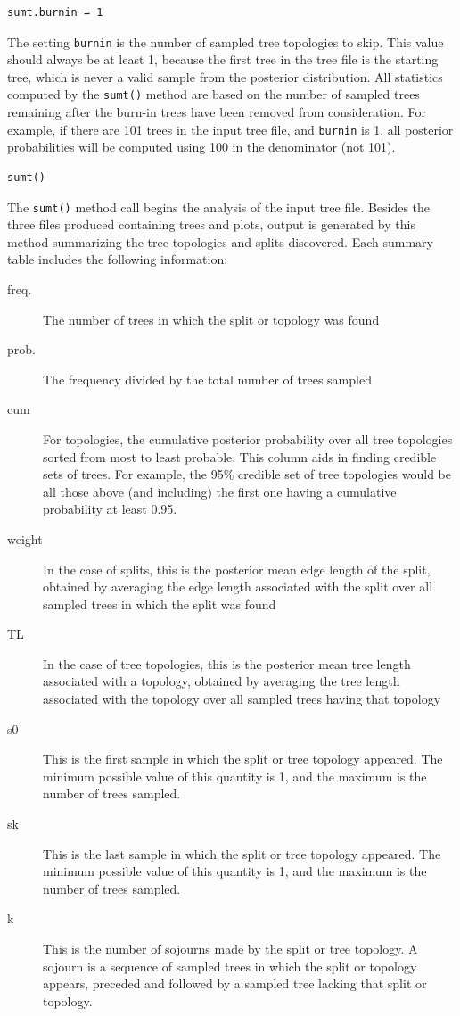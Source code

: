 \documentclass[10pt]{article}
\newcommand{\opt}[1]{{\tt \small #1}\index{#1}}		%
\begin{document}
\begin{samepage}
\begin{verbatim}
sumt.burnin = 1
\end{verbatim}
The setting \opt{burnin} is the number of sampled tree topologies to skip. This value should always be at least 1, because the first tree in the tree file is the starting tree, which is never a valid sample from the posterior distribution. All statistics computed by the {\tt sumt()} method are based on the number of sampled trees remaining after the burn-in trees have been removed from consideration. For example, if there are 101 trees in the input tree file, and \opt{burnin} is 1, all posterior probabilities will be computed using 100 in the denominator (not 101).
\end{samepage}

\begin{samepage}
\begin{verbatim}
sumt()
\end{verbatim}
The {\tt sumt()} method call begins the analysis of the input tree file. Besides the three files produced containing trees and plots, output is generated by this method summarizing the tree topologies and splits discovered. Each summary table includes the following information:
\end{samepage}
\begin{description}
\item[freq.] The number of trees in which the split or topology was found
\item[prob.] The frequency divided by the total number of trees sampled
\item[cum] For topologies, the cumulative posterior probability over all tree topologies sorted from most to least probable. This column aids in finding credible sets of trees. For example, the 95\% credible set of tree topologies would be all those above (and including) the first one having a cumulative probability at least 0.95.
\item[weight] In the case of splits, this is the posterior mean edge length of the split, obtained by averaging the edge length associated with the split over all sampled trees in which the split was found
\item[TL] In the case of tree topologies, this is the posterior mean tree length associated with a topology, obtained by averaging the tree length associated with the topology over all sampled trees having that topology
\item[s0] This is the first sample in which the split or tree topology appeared. The minimum possible value of this quantity is 1, and the maximum is the number of trees sampled.
\item[sk] This is the last sample in which the split or tree topology appeared. The minimum possible value of this quantity is 1, and the maximum is the number of trees sampled.
\item[k] This is the number of sojourns made by the split or tree topology. A sojourn is a sequence of sampled trees in which the split or topology appears, preceded and followed by a sampled tree lacking that split or topology.
\end{description}
\end{document}
